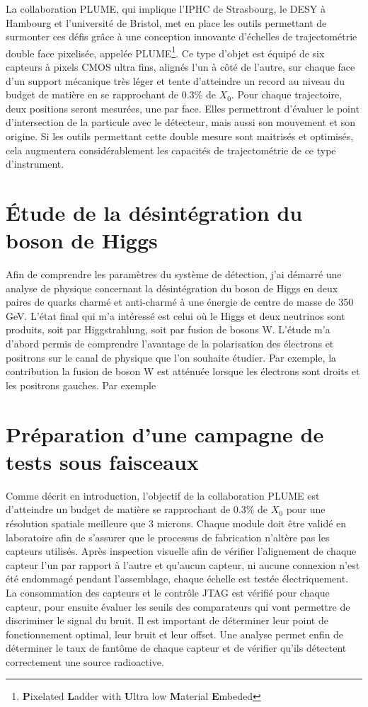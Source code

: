 \documentclass[a4papper, 10pt]{article}
\begin{document}
  La collaboration PLUME, qui implique l'IPHC de Strasbourg, le DESY à Hambourg et l'université de Bristol, met en place les outils permettant de surmonter ces défis grâce à une conception innovante d'échelles de trajectométrie double face pixelisée, appelée PLUME\footnote{\textbf{P}ixelated \textbf{L}adder with \textbf{U}ltra low \textbf{M}aterial \textbf{E}mbeded}. 
  Ce type d'objet est équipé de six capteurs à pixels CMOS ultra fins, alignés l'un à côté de l'autre, sur chaque face d'un support mécanique très léger et tente d'atteindre un record au niveau du budget de matière en se rapprochant de 0.3\% de $X_0$.
  Pour chaque trajectoire, deux positions seront mesurées, une par face. 
  Elles permettront d'évaluer le point d'intersection de la particule avec le détecteur, mais aussi son mouvement et son origine. 
  Si les outils permettant cette double mesure sont maitrisés et optimisés, cela augmentera considérablement les capacités de trajectométrie de ce type d'instrument.
  
  \section{Étude de la désintégration du boson de Higgs}

  Afin de comprendre les paramètres du système de détection, j'ai démarré une analyse de physique concernant la désintégration du boson de Higgs en deux paires de quarks charmé et anti-charmé à une énergie de centre de masse de 350 GeV.
  L'état final qui m'a intéressé est celui où le Higgs et deux neutrinos sont produits, soit par Higgstrahlung, soit par fusion de bosons W.
  L'étude m'a d'abord permis de comprendre l'avantage de la polarisation des électrons et positrons sur le canal de physique que l'on souhaite étudier.
  Par exemple, la contribution la fusion de boson W est atténuée lorsque les électrons sont droits et les positrons gauches.
  Par exemple

  \section{Préparation d'une campagne de tests sous faisceaux}

  Comme décrit en introduction, l'objectif de la collaboration PLUME est d'atteindre un budget de matière se rapprochant de 0.3\% de $X_0$ pour une résolution spatiale meilleure que 3 microns.   
  Chaque module doit être validé en laboratoire afin de s'assurer que le processus de fabrication n'altère pas les capteurs utilisés.
  Après inspection visuelle afin de vérifier l'alignement de chaque capteur l'un par rapport à l'autre et qu'aucun capteur, ni aucune connexion n'est été endommagé pendant l'assemblage, chaque échelle est testée électriquement.
  La consommation des capteurs et le contrôle JTAG est vérifié pour chaque capteur, pour ensuite évaluer les seuils des comparateurs qui vont permettre de discriminer le signal du bruit.
  Il est important de déterminer leur point de fonctionnement optimal, leur bruit et leur offset. 
  Une analyse permet enfin de déterminer le taux de fantôme de chaque capteur et de vérifier qu'ils détectent correctement une source radioactive.
\end{document}
